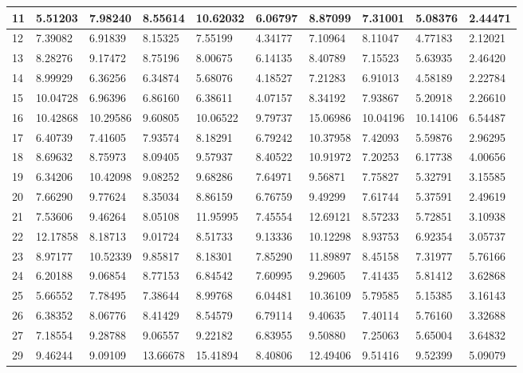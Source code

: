 \begin{table}[H]
{\begin{tabular}{|l|l|l|l|l|l|l|l|l|l|}
        11 & 5.51203 & 7.98240 & 8.55614 & 10.62032 & 6.06797 & 8.87099 & 7.31001 & 5.08376 & 2.44471 \\ \hline
        12 & 7.39082 & 6.91839 & 8.15325 & 7.55199 & 4.34177 & 7.10964 & 8.11047 & 4.77183 & 2.12021 \\ \hline
        13 & 8.28276 & 9.17472 & 8.75196 & 8.00675 & 6.14135 & 8.40789 & 7.15523 & 5.63935 & 2.46420 \\ \hline
        14 & 8.99929 & 6.36256 & 6.34874 & 5.68076 & 4.18527 & 7.21283 & 6.91013 & 4.58189 & 2.22784 \\ \hline
        15 & 10.04728 & 6.96396 & 6.86160 & 6.38611 & 4.07157 & 8.34192 & 7.93867 & 5.20918 & 2.26610 \\ \hline
        16 & 10.42868 & 10.29586 & 9.60805 & 10.06522 & 9.79737 & 15.06986 & 10.04196 & 10.14106 & 6.54487 \\ \hline
        17 & 6.40739 & 7.41605 & 7.93574 & 8.18291 & 6.79242 & 10.37958 & 7.42093 & 5.59876 & 2.96295 \\ \hline
        18 & 8.69632 & 8.75973 & 8.09405 & 9.57937 & 8.40522 & 10.91972 & 7.20253 & 6.17738 & 4.00656 \\ \hline
        19 & 6.34206 & 10.42098 & 9.08252 & 9.68286 & 7.64971 & 9.56871 & 7.75827 & 5.32791 & 3.15585 \\ \hline
        20 & 7.66290 & 9.77624 & 8.35034 & 8.86159 & 6.76759 & 9.49299 & 7.61744 & 5.37591 & 2.49619 \\ \hline
        21 & 7.53606 & 9.46264 & 8.05108 & 11.95995 & 7.45554 & 12.69121 & 8.57233 & 5.72851 & 3.10938 \\ \hline
        22 & 12.17858 & 8.18713 & 9.01724 & 8.51733 & 9.13336 & 10.12298 & 8.93753 & 6.92354 & 3.05737 \\ \hline
        23 & 8.97177 & 10.52339 & 9.85817 & 8.18301 & 7.85290 & 11.89897 & 8.45158 & 7.31977 & 5.76166 \\ \hline
        24 & 6.20188 & 9.06854 & 8.77153 & 6.84542 & 7.60995 & 9.29605 & 7.41435 & 5.81412 & 3.62868 \\ \hline
        25 & 5.66552 & 7.78495 & 7.38644 & 8.99768 & 6.04481 & 10.36109 & 5.79585 & 5.15385 & 3.16143 \\ \hline
        26 & 6.38352 & 8.06776 & 8.41429 & 8.54579 & 6.79114 & 9.40635 & 7.40114 & 5.76160 & 3.32688 \\ \hline
        27 & 7.18554 & 9.28788 & 9.06557 & 9.22182 & 6.83955 & 9.50880 & 7.25063 & 5.65004 & 3.64832 \\ \hline
        29 & 9.46244 & 9.09109 & 13.66678 & 15.41894 & 8.40806 & 12.49406 & 9.51416 & 9.52399 & 5.09079 \\ \hline

\end{tabular}}
\end{table}
